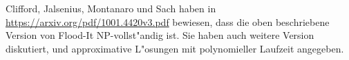\begin{diskussion}
Clifford, Jalsenius, Montanaro und Sach haben in
\url{https://arxiv.org/pdf/1001.4420v3.pdf} bewiesen, dass die oben
beschriebene Version von Flood-It NP-vollst"andig ist.
Sie haben auch weitere Version diskutiert, und approximative L"osungen
mit polynomieller Laufzeit angegeben.
\end{diskussion}

\begin{bewertung}
\end{bewertung}

